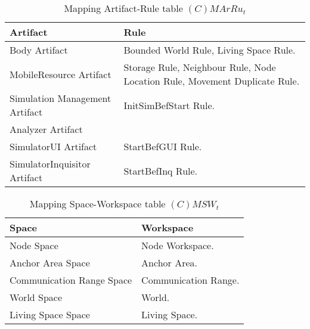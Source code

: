 \begin{table}[H]
	\centering
	\begin{tabular}{|p{4cm}|p{8cm}|}
			\hline
			\textbf{Artifact} & \textbf{Rule} \\
			\hline
			Body Artifact & Bounded World Rule, Living Space Rule. \\
			\hline
			MobileResource Artifact & Storage Rule, Neighbour Rule, Node Location
			Rule, Movement Duplicate Rule. \\
			\hline
			Simulation Management Artifact & InitSimBefStart Rule. \\
			\hline
			Analyzer Artifact & \\
			\hline
			SimulatorUI Artifact & StartBefGUI Rule. \\
			\hline
			SimulatorInquisitor Artifact & StartBefInq Rule. \\
			\hline
		\end{tabular}
	\caption{Mapping Artifact-Rule table $(C)MArRu_t$}
	\label{tab:cmarrut}
\end{table}

\begin{table}[H]
	\centering
	\begin{tabular}{|p{4cm}|p{8cm}|}
			\hline
			\textbf{Space} & \textbf{Workspace} \\
			\hline
			Node Space & Node Workspace. \\
			\hline
			Anchor Area Space & Anchor Area. \\
			\hline
			Communication Range Space & Communication Range.\\
			\hline
			World Space & World. \\
			\hline
			Living Space Space & Living Space. \\
			\hline
		\end{tabular}
	\caption{Mapping Space-Workspace table $(C)MSW_t$}
	\label{tab:cmsrt}
\end{table}

